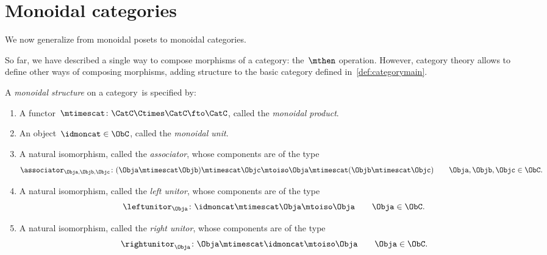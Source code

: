 
\section{Monoidal categories}
\label{sec:parallelism-mon-cat}

We now generalize from monoidal posets to monoidal categories.

So far, we have described a single way to compose morphisms of a category: the~$\mthen$ operation.
However, category theory allows to define other ways of composing morphisms, adding structure to the basic category defined in~\cref{def:categorymain}.

\begin{ctdefinition}
    \label{def:monoidal-cat}
    A \emph{monoidal structure} on a category~\CatC is specified by:

    \constit
    \begin{enumerate}
        \item A functor~$\mtimescat \colon \CatC \Ctimes \CatC\fto \CatC$, called the \emph{monoidal product}.
        \item An object~$\idmoncat \in \ObC$, called the \emph{monoidal unit}.
        \item A natural isomorphism, called the \emph{associator}, whose components are of the type
              \begin{equation*}
                  \associator_{\Obja,\Objb,\Objc}\colon (\Obja \mtimescat \Objb )\mtimescat \Objc \mtoiso \Obja\mtimescat (\Objb \mtimescat \Objc) \quad \quad \Obja,\Objb,\Objc\in \ObC.
              \end{equation*}
        \item A natural isomorphism, called the \emph{left unitor}, whose components are of the type
              \begin{equation*}
                  \leftunitor_\Obja \colon \idmoncat\mtimescat \Obja \mtoiso \Obja \quad \quad \Obja\in \ObC.
              \end{equation*}
        \item A natural isomorphism, called the \emph{right unitor}, whose components are of the type
              \begin{equation*}
                  \rightunitor_\Obja \colon \Obja \mtimescat \idmoncat \mtoiso \Obja \quad \quad \Obja\in \ObC.
              \end{equation*}
    \end{enumerate}


\end{ctdefinition}
